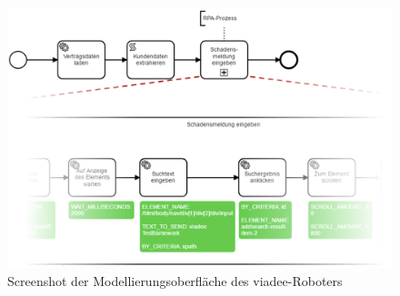 \begin{figure}[h!]
    \centering
    \includegraphics[width=1.0\textwidth]{Bachelorarbeit/images/ScreenshotRelatedWork3.png}
    \caption{Screenshot der Modellierungsoberfläche des viadee-Roboters}
    \label{fig:viadee}
\end{figure}
